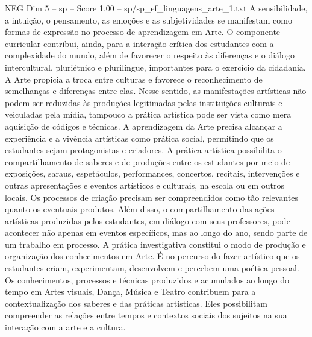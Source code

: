 \begin{textsample}{NEG Dim 5 – sp – Score 1.00 – sp/sp\_ef\_linguagens\_arte\_1.txt}
A sensibilidade, a intuição, o pensamento, as emoções e as subjetividades se manifestam como formas de expressão no processo de aprendizagem em Arte.
O componente curricular contribui, ainda, para a interação crítica dos estudantes com a complexidade do mundo, além de favorecer o respeito às diferenças e o diálogo intercultural, pluriétnico e plurilíngue, importantes para o exercício da cidadania.
A Arte propicia a troca entre culturas e favorece o reconhecimento de semelhanças e diferenças entre elas.
Nesse sentido, as manifestações artísticas não podem ser reduzidas às produções legitimadas pelas instituições culturais e veiculadas pela mídia, tampouco a prática artística pode ser vista como mera aquisição de códigos e técnicas.
A aprendizagem da Arte precisa alcançar a experiência e a vivência artísticas como prática social, permitindo que os estudantes sejam protagonistas e criadores.
A prática artística possibilita o compartilhamento de saberes e de produções entre os estudantes por meio de exposições, saraus, espetáculos, performances, concertos, recitais, intervenções e outras apresentações e eventos artísticos e culturais, na escola ou em outros locais.
Os processos de criação precisam ser compreendidos como tão relevantes quanto os eventuais produtos.
Além disso, o compartilhamento das ações artísticas produzidas pelos estudantes, em diálogo com seus professores, pode acontecer não apenas em eventos específicos, mas ao longo do ano, sendo parte de um trabalho em processo.
A prática investigativa constitui o modo de produção e organização dos conhecimentos em Arte.
É no percurso do fazer artístico que os estudantes criam, experimentam, desenvolvem e percebem uma poética pessoal.
Os conhecimentos, processos e técnicas produzidos e acumulados ao longo do tempo em Artes visuais, Dança, Música e Teatro contribuem para a contextualização dos saberes e das práticas artísticas.
Eles possibilitam compreender as relações entre tempos e contextos sociais dos sujeitos na sua interação com a arte e a cultura.

\end{textsample}
